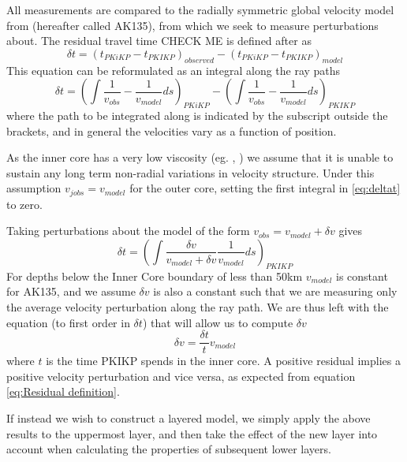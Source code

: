 \documentclass[11pt,a4paper]{article}
\begin{document}
All measurements are compared to the radially symmetric global velocity model from \cite{Kennett1995b} (hereafter called AK135), from which we seek to measure perturbations about. The residual travel time CHECK ME is defined after \cite{Waszek2011a} as
\begin{equation}
	\delta t = \left ( t_{PKiKP} - t_{PKIKP} \right )_{observed} -  \left ( t_{PKiKP} - t_{PKIKP} \right )_{model}
	\label{eq:Residual definition}
\end{equation}
This equation can be reformulated as an integral along the ray paths
\begin{equation}
		\delta t = \left (  \int \frac{1}{v_{obs}} - \frac{1}{v_{model}} ds  \right )_{PKiKP} - \left (  \int \frac{1}{v_{obs}} - \frac{1}{v_{model}} ds \right )_{PKIKP}
		\label{eq:deltat}
\end{equation}
where the path to be integrated along is indicated by the subscript outside the brackets, and in general the velocities vary as a function of position.

As the inner core has a very low viscosity (eg. \cite{Wijs1998}, \cite{Zhang2000}) we assume that it is unable to sustain any long term non-radial variations in velocity structure. Under this assumption $v_{jobs} = v_{model}$ for the outer core, setting the first integral in \eqref{eq:deltat} to zero.

Taking perturbations about the model of the form $v_{obs} = v_{model} + \delta v$ gives
\begin{equation}
	\delta t =\left ( \int \frac{\delta v}{v_{model} + \delta v }\frac{1}{v_{model}} ds \right )_{PKIKP}
\end{equation}
For depths below the Inner Core boundary of less than 50km $v_{model}$ is constant for AK135, and we assume $\delta v$ is also a constant such that we are measuring only the average velocity perturbation along the ray path. We are thus left with the equation (to first order in $\delta t$) that will allow us to compute $\delta v$
\begin{equation}
	\delta v = \frac{\delta t}{t} v_{model}
\end{equation}
where $t$ is the time PKIKP spends in the inner core. A positive residual implies a positive velocity perturbation and vice versa, as expected from equation \eqref{eq:Residual definition}.

If instead we wish to construct a layered model, we simply apply the above results to the uppermost layer, and then take the effect of the new layer into account when calculating the properties of subsequent lower layers.
\end{document}
